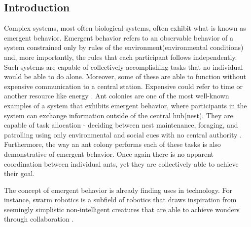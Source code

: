 \documentclass[a4paper, 12pt, times]{article}
\begin{document}
\begin{multicols}{2}
\section{Introduction}
Complex systems, most often biological systems, often exhibit what is known as emergent behavior. Emergent behavior refers to an observable behavior of a system constrained only by rules of the environment(environmental conditions) and, more importantly, the rules that each participant follows independently. Such systems are capable of collectively accomplishing tasks that no individual would be able to do alone. Moreover, some of these are able to function without expensive communication to a central station. Expensive could refer to time or another resource like energy \parencite{marsh_demystification_2009}. Ant colonies are one of the most well-known examples of a system that exhibits emergent behavior, where participants in the system can exchange information outside of the central hub(nest). They are capable of task allocation - deciding between nest maintenance, foraging, and patrolling using only environmental and social cues with no central authority \parencite{gordon_organization_1996}. Furthermore, the way an ant colony performs each of these tasks is also demonstrative of emergent behavior. Once again there is no apparent coordination between individual ants, yet they are collectively able to achieve their goal.
\par The concept of emergent behavior is already finding uses in technology. For instance, swarm robotics is a subfield of robotics that draws inspiration from seemingly simplistic non-intelligent creatures that are able to achieve wonders through collaboration \parencite{schranz_swarm_2020}.

\end{multicols}
\end{document}
